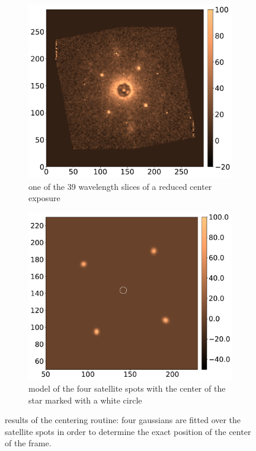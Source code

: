 \documentclass[twoside,single]{lion-msc}
\begin{document}
\begin{figure}[!t]
\centering
\begin{subfigure}{.48\textwidth}
  \centering
  \includegraphics[width=1\linewidth]{centerframe}
  \caption{one of the 39 wavelength slices of a reduced center exposure\\}
  \label{fig:centerframe}
\end{subfigure}\hfill
\begin{subfigure}{.48\textwidth}
  \centering
  \includegraphics[width=1\linewidth]{centermodel}%
  \caption{model of the four satellite spots with the center of the star marked with a white circle}
  \label{fig:centermodel}
\end{subfigure}
\caption{results of the centering routine: four gaussians are fitted over the satellite spots in order to determine the exact position of the center of the frame.}
\end{figure}
\end{document}
